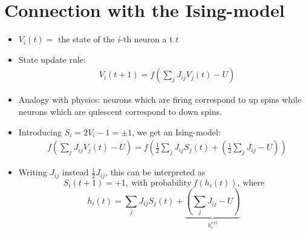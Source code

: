 \documentclass[12pt]{article}
\numberwithin{equation}{section}
\begin{document}
\section*{Connection with the Ising-model}
\begin{itemize}
    \item $V_i(t)=$ the state of the $i$-th neuron a t $t$
    \item State update rule:
    \begin{align*}
        & V_i(t+1) = f\left(\sum\limits_{j}J_{ij}V_j(t) - U\right)
    \end{align*}
    \item Analogy with physics: neurons which are firing correspond to up spins while neurons which are 
    quiescent correspond to down spins.
    \item Introducing $S_i = 2V_i - 1 = \pm 1$, we get an Ising-model:
    \begin{align*}
        &f\left(\sum\limits_{j}J_{ij}V_j(t) - U\right) = f\left(\frac{1}{2}\sum\limits_{j}J_{ij}S_j(t)
        + \left(\frac{1}{2}\sum\limits_{j}J_{ij} - U\right)\right)
    \end{align*}
    \item Writing $J_{ij}$ instead $\frac{1}{2}J_{ij}$, this can be interpreted as 
    \begin{equation*}
        S_i(t+1) = +1,~\textrm{with probability}~f(h_i(t)),\,\textrm{where}
    \end{equation*}
    \begin{equation*}
        h_i(t) = \sum\limits_jJ_{ij}S_j(t) + \underbrace{\left(\sum\limits_jJ_{ij}-U\right)}_{h_i^{ext}}
    \end{equation*}
\end{itemize}

\newpage
\end{document}
